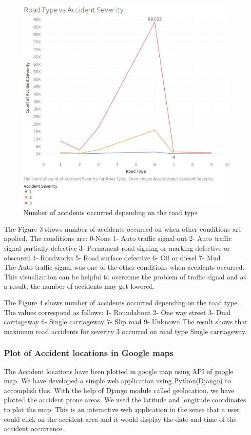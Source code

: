\documentclass{acm_proc_article-sp}
\begin{document}
\begin{figure}
  \centering
      \includegraphics[width=1.0\columnwidth]{images/roadtype.jpg}
  \caption{Number of accidents occurred depending on the road type}
\end{figure}
The Figure 3 shows number of accidents occurred on when other conditions are applied. The conditions are:
0-None
1- Auto traffic signal out
2- Auto traffic signal partially defective 
3- Permanent road signing or marking defective or obscured
4- Roadworks
5- Road surface defective 
6- Oil or diesel
7- Mud \\
The Auto traffic signal was one of the other conditions when accidents occurred. This visualization can be helpful to overcome the problem of traffic signal and as a result, the number of accidents may get lowered.

The Figure 4 shows number of accidents occurred depending on the road type. The values correspond as follows: 
1- Roundabout
2- One way street
3- Dual carriageway
6- Single carriageway
7- Slip road
9- Unknown
The result shows that maximum road accidents for severity 3 occurred on road type Single carriageway.

\subsubsection{Plot of Accident locations in Google maps}
The Accident locations have been plotted in google map using API of google map.
 We have developed a simple web application using Python(Django) to accomplish this. With the help of Django module called geolocation, we have plotted the accident prone areas. We used the latitude and longitude coordinates to plot the map. This is an interactive web application in the sense that a user could click on the accident area and it would display the date and time of the accident occurrence. 
\end{document}
